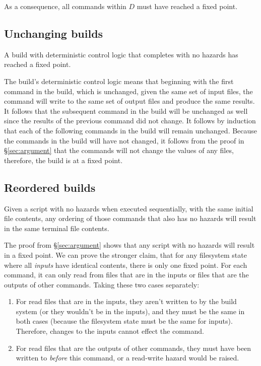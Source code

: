 As a consequence, all commands within $D$ must have reached a fixed point.

\subsection{Unchanging builds}
\label{sec:proof:no_rebuild}

\claim A build with deterministic control logic that completes with no hazards has reached a fixed point.  %



\proof The build's deterministic control logic means that beginning with the first command in the build, which is unchanged, given the same set of input files, the command will write to the same set of output files and produce the same results.  It follows that the subsequent command in the build will be unchanged as well since the results of the previous command did not change.  It follows by induction that each of the following commands in the build will remain unchanged.
Because the commands in the build will have not changed, it follows from the proof in \S\ref{sec:argument} that the commands will not change the values of any files, therefore, the build is at a fixed point.

\subsection{Reordered builds}
\label{sec:proof:reorder}

\claim Given a script with no hazards when executed sequentially, with the same initial file contents, any ordering of those commands that also has no hazards will result in the same terminal file contents.

\proof The proof from \S\ref{sec:argument} shows that any script with no hazards will result in a fixed point. We can prove the stronger claim, that for any filesystem state where all \emph{inputs} have identical contents, there is only one fixed point. For each command, it can only read from files that are in the inputs or files that are the outputs of other commands. Taking these two cases separately:

\begin{enumerate}
\item For read files that are in the inputs, they aren't written to by the build system (or they wouldn't be in the inputs), and they must be the same in both cases (because the filesystem state must be the same for inputs). Therefore, changes to the inputs cannot effect the command.
\item For read files that are the outputs of other commands, they must have been written to \emph{before} this command, or a read-write hazard would be raised.
\end{enumerate}

